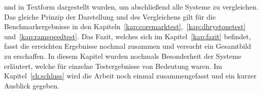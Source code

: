 und in Textform dargestellt wurden, um abschließend alle Systeme zu vergleichen.\\
Das gleiche Prinzip der Darstellung und des Vergleichens gilt für die Benchmarkergebnisse in den Kapiteln~\ref{kap:coremarktest},~\ref{kap:dhrystonetest} und~\ref{kap:ramspeedtest}.
Das Fazit, welches sich im Kapitel~\ref{kap:fazit} befindet, fasst die erreichten Ergebnisse nochmal zusammen und versucht ein Gesamtbild zu erschaffen. In diesem Kapitel wurden nochmals Besonderheit der
Systeme erläutert, welche für einzelne Testergebnisse von Bedeutung waren.
Im Kapitel~\ref{ch:schluss} wird die Arbeit noch einmal zusammengefasst und ein kurzer Ausblick gegeben.\\
